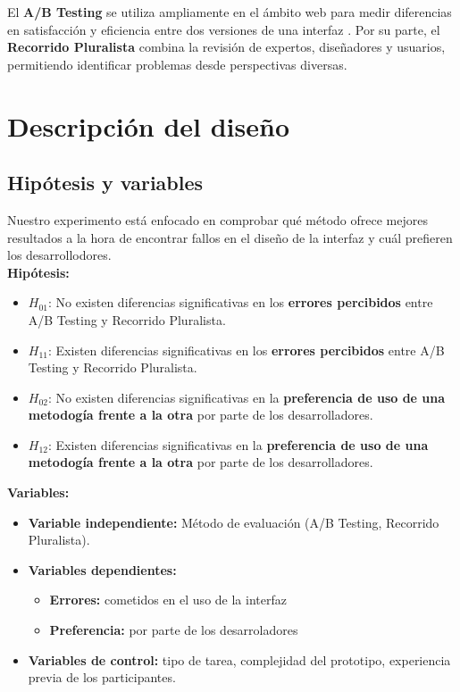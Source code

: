 \documentclass[a4paper,12pt]{report}
\begin{document}
El \textbf{A/B Testing} se utiliza ampliamente en el ámbito web para medir diferencias en satisfacción y eficiencia entre dos versiones de una interfaz \cite{kohavi2009controlled}. Por su parte, el \textbf{Recorrido Pluralista} \cite{biasPluralistic} combina la revisión de expertos, diseñadores y usuarios, permitiendo identificar problemas desde perspectivas diversas.


\chapter{Descripción del diseño}

\section{Hipótesis y variables}

Nuestro experimento está enfocado en comprobar qué método ofrece mejores resultados a la hora de encontrar fallos en el diseño de la interfaz y cuál prefieren los desarrollodores. \\
\vspace{0.1cm}
\textbf{Hipótesis:}
\begin{itemize}
    \item $H_{01}$: No existen diferencias significativas en los \textbf{errores percibidos} entre A/B Testing y Recorrido Pluralista.  
    \item $H_{11}$: Existen diferencias significativas en los \textbf{errores percibidos} entre A/B Testing y Recorrido Pluralista.
        \item $H_{02}$: No existen diferencias significativas en la \textbf{preferencia de uso de una metodogía frente a la otra} por parte de los desarrolladores.  
    \item $H_{12}$: Existen diferencias significativas en la \textbf{preferencia de uso de una metodogía frente a la otra} por parte de los desarrolladores.
\end{itemize}

\textbf{Variables:}
\begin{itemize}
    \item \textbf{Variable independiente:} Método de evaluación (A/B Testing, Recorrido Pluralista).
    \item \textbf{Variables dependientes:}
    \begin{itemize}
        \item \textbf{Errores:} cometidos en el uso de la interfaz
        \item \textbf{Preferencia:} por parte de los desarroladores
    \end{itemize}
    \item \textbf{Variables de control:} tipo de tarea, complejidad del prototipo, experiencia previa de los participantes.
\end{itemize}
\end{document}
